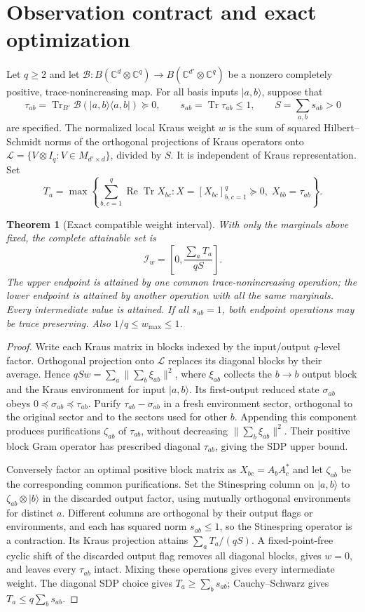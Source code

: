 \documentclass[10pt,letterpaper]{article}
\newtheorem{theorem}{Theorem}
\newcommand{\Tr}{\operatorname{Tr}}
\newcommand{\cB}{\mathcal B}
\begin{document}
\section{Observation contract and exact optimization}
Let $q\ge2$ and let $\cB:B(\mathbb C^d\otimes\mathbb C^q)\to B(\mathbb C^{d'}\otimes\mathbb C^q)$ be a nonzero completely positive, trace-nonincreasing map. For all basis inputs $|a,b\rangle$, suppose that
\[
\tau_{ab}=\Tr_{B'}\cB(|a,b\rangle\langle a,b|)\succeq0,\qquad s_{ab}=\Tr\tau_{ab}\le1,\qquad S=\sum_{a,b}s_{ab}>0
\]
are specified. The normalized local Kraus weight $w$ is the sum of squared Hilbert--Schmidt norms of the orthogonal projections of Kraus operators onto $\mathcal L=\{V\otimes I_q: V\in M_{d'\times d}\}$, divided by $S$. It is independent of Kraus representation. Set
\[
T_a=\max\left\{\sum_{b,c=1}^q\operatorname{Re}\Tr X_{bc}:X=[X_{bc}]_{b,c=1}^q\succeq0,\;X_{bb}=\tau_{ab}\right\}.
\]
\begin{theorem}[Exact compatible weight interval]
With only the marginals above fixed, the complete attainable set is
\[
\boxed{\mathcal I_w=\left[0,\frac{\sum_a T_a}{qS}\right].}
\]
The upper endpoint is attained by one common trace-nonincreasing operation; the lower endpoint is attained by another operation with all the same marginals. Every intermediate value is attained. If all $s_{ab}=1$, both endpoint operations may be trace preserving. Also $1/q\le w_{\max}\le1$.
\end{theorem}
\begin{proof}
Write each Kraus matrix in blocks indexed by the input/output $q$-level factor. Orthogonal projection onto $\mathcal L$ replaces its diagonal blocks by their average. Hence $qSw=\sum_a\|\sum_b\xi_{ab}\|^2$, where $\xi_{ab}$ collects the $b\to b$ output block and the Kraus environment for input $|a,b\rangle$. Its first-output reduced state $\sigma_{ab}$ obeys $0\preceq\sigma_{ab}\preceq\tau_{ab}$. Purify $\tau_{ab}-\sigma_{ab}$ in a fresh environment sector, orthogonal to the original sector and to the sectors used for other $b$. Appending this component produces purifications $\zeta_{ab}$ of $\tau_{ab}$, without decreasing $\|\sum_b\xi_{ab}\|^2$. Their positive block Gram operator has prescribed diagonal $\tau_{ab}$, giving the SDP upper bound.

Conversely factor an optimal positive block matrix as $X_{bc}=A_bA_c^*$ and let $\zeta_{ab}$ be the corresponding common purifications. Set the Stinespring column on $|a,b\rangle$ to $\zeta_{ab}\otimes|b\rangle$ in the discarded output factor, using mutually orthogonal environments for distinct $a$. Different columns are orthogonal by their output flags or environments, and each has squared norm $s_{ab}\le1$, so the Stinespring operator is a contraction. Its Kraus projection attains $\sum_aT_a/(qS)$. A fixed-point-free cyclic shift of the discarded output flag removes all diagonal blocks, gives $w=0$, and leaves every $\tau_{ab}$ intact. Mixing these operations gives every intermediate weight. The diagonal SDP choice gives $T_a\ge\sum_b s_{ab}$; Cauchy--Schwarz gives $T_a\le q\sum_b s_{ab}$.
\end{proof}
\end{document}
